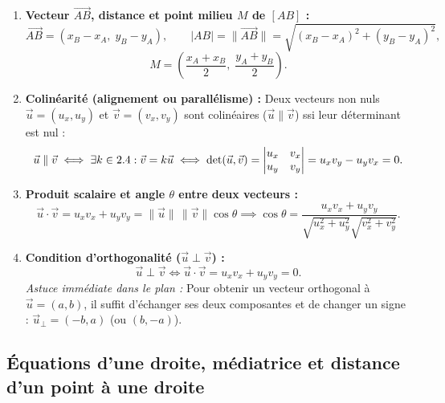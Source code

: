 \begin{theoreme}
\begin{enumerate}
    \item \textbf{Vecteur $\overrightarrow{AB}$, distance et point milieu $M$ de $[AB]$ :}
    \[
        \overrightarrow{AB} = (x_B - x_A,\; y_B - y_A), \qquad |AB| = \|\overrightarrow{AB}\| = \sqrt{(x_B-x_A)^2 + (y_B-y_A)^2},
    \]
    \[
        M = \left(\frac{x_A+x_B}{2},\; \frac{y_A+y_B}{2}\right).
    \]
    \item \textbf{Colinéarité (alignement ou parallélisme) :} Deux vecteurs non nuls $\vec{u} = (u_x, u_y)$ et $\vec{v} = (v_x, v_y)$ sont colinéaires ($\vec{u} \parallel \vec{v}$) ssi leur déterminant est nul :
    \[
        \vec{u} \parallel \vec{v} \iff \exists k \in 2.4 : \vec{v} = k\vec{u} \iff \det(\vec{u},\vec{v}) = \begin{vmatrix} u_x & v_x \\ u_y & v_y \end{vmatrix} = u_x v_y - u_y v_x = 0.
    \]
    \item \textbf{Produit scalaire et angle $\theta$ entre deux vecteurs :}
    \[
        \boxed{\vec{u} \cdot \vec{v} = u_x v_x + u_y v_y = \|\vec{u}\|\,\|\vec{v}\|\cos\theta} \implies \cos\theta = \frac{u_x v_x + u_y v_y}{\sqrt{u_x^2+u_y^2}\sqrt{v_x^2+v_y^2}}.
    \]
    \item \textbf{Condition d'orthogonalité ($\vec{u} \perp \vec{v}$) :}
    \[
        \boxed{\vec{u} \perp \vec{v} \iff \vec{u} \cdot \vec{v} = u_x v_x + u_y v_y = 0}.
    \]
    \emph{Astuce immédiate dans le plan :} Pour obtenir un vecteur orthogonal à $\vec{u} = (a, b)$, il suffit d'échanger ses deux composantes et de changer un signe : $\vec{u}_\perp = (-b, a)$ (ou $(b, -a)$).
\end{enumerate}
\end{theoreme}

\subsection{Équations d'une droite, médiatrice et distance d'un point à une droite}


